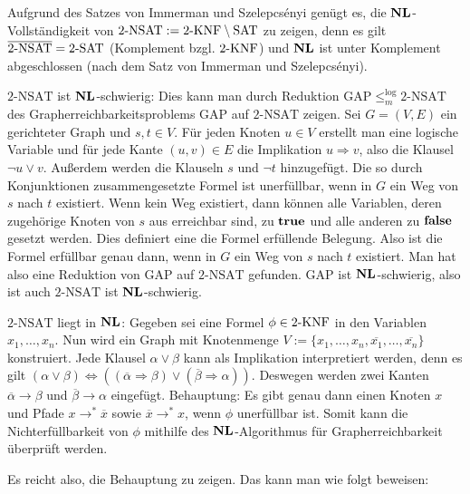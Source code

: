 \begin{Beweis}
    Aufgrund des Satzes von Immerman und Szelepcsényi genügt es,
    die $\mathbf{NL}$-Vollständig\-keit von
    $2\text{-NSAT} := 2\text{-KNF} \setminus \text{SAT}$ zu zeigen,
    denn es gilt $\overline{2\text{-NSAT}} = 2\text{-SAT}$
    (Komplement bzgl. $2\text{-KNF}$) und $\mathbf{NL}$ ist unter Komplement abgeschlossen
    (nach dem Satz von Immerman und Szelepcsényi).

    $2\text{-NSAT}$ ist $\mathbf{NL}$-schwierig:
    Dies kann man durch Reduktion $\text{GAP} \le_m^{\log} 2\text{-NSAT}$ des
    Grapherreichbarkeitsproblems GAP auf $2\text{-NSAT}$ zeigen.
    Sei $G = (V, E)$ ein gerichteter Graph und $s, t \in V$.
    Für jeden Knoten $u \in V$ erstellt man eine logische Variable und
    für jede Kante $(u, v) \in E$ die Implikation $u \Rightarrow v$,
    also die Klausel $\lnot u \lor v$.
    Außerdem werden die Klauseln $s$ und $\lnot t$ hinzugefügt.
    Die so durch Konjunktionen zusammengesetzte Formel ist unerfüllbar,
    wenn in $G$ ein Weg von $s$ nach $t$ existiert.
    Wenn kein Weg existiert, dann können alle Variablen, deren zugehörige Knoten von $s$ aus
    erreichbar sind, zu $\mathbf{true}$ und alle anderen zu $\mathbf{false}$ gesetzt werden.
    Dies definiert eine die Formel erfüllende Belegung.
    Also ist die Formel erfüllbar genau dann, wenn in $G$ ein Weg von $s$ nach $t$ existiert.
    Man hat also eine Reduktion von GAP auf $2\text{-NSAT}$ gefunden.
    GAP ist $\mathbf{NL}$-schwierig, also ist auch $2\text{-NSAT}$ ist $\mathbf{NL}$-schwierig.

    $2\text{-NSAT}$ liegt in $\mathbf{NL}$:
    Gegeben sei eine Formel $\phi \in 2\text{-KNF}$
    in den Variablen $x_1, \dotsc, x_n$.
    Nun wird ein Graph mit Knotenmenge $V := \{x_1, \dotsc, x_n,
    \overline{x_1}, \dotsc, \overline{x_n}\}$ konstruiert.
    Jede Klausel $\alpha \lor \beta$ kann als Implikation interpretiert werden,
    denn es gilt $(\alpha \lor \beta) \iff ((\overline{\alpha} \Rightarrow \beta) \lor
    (\overline{\beta} \Rightarrow \alpha))$.
    Deswegen werden zwei Kanten $\overline{\alpha} \rightarrow \beta$ und
    $\overline{\beta} \rightarrow \alpha$ eingefügt.
    Behauptung: Es gibt genau dann einen Knoten $x$ und
    Pfade $x \rightarrow^\ast \overline{x}$ sowie $\overline{x} \rightarrow^\ast x$,
    wenn $\phi$ unerfüllbar ist.
    Somit kann die Nichterfüllbarkeit von $\phi$ mithilfe des $\mathbf{NL}$-Algorithmus
    für Grapherreichbarkeit überprüft werden.

    Es reicht also, die Behauptung zu zeigen.
    Das kann man wie folgt beweisen:


\end{Beweis}
